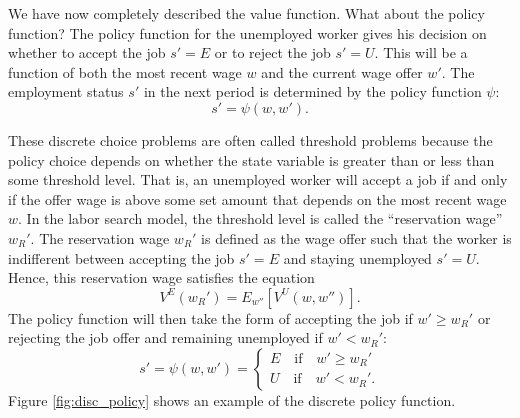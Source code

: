We have now completely described the value function. What about the policy function?
The policy function for the unemployed worker gives his decision on whether to accept the job $s'=E$
or to reject the job $s'= U$.
This will be a function of both the most recent wage $w$ and the current wage offer $w'$.
The employment status $s'$ in the next period is determined by the policy function $\psi$:
\[
s' = \psi(w,w').
\]

These discrete choice problems are often called threshold
problems because the policy choice depends on whether the state variable is greater than or less than
some threshold level. That is, an unemployed worker will accept a job if and only if the offer wage is
above some set amount that depends on the most recent wage $w$. In the labor search model,
the threshold level is called the ``reservation wage'' $w_R'$. The reservation wage $w_R'$ is defined as
the wage offer such that the worker is indifferent between accepting the job $s' = E$ and
staying unemployed $s' = U$. Hence, this reservation wage satisfies the equation
\begin{equation}\label{EqWR}
   V^E(w_R') = E_{w''}\left[V^U(w,w'')\right].
\end{equation}
The policy function will then take the form of accepting the job if $w' \geq w_R'$ or
rejecting the job offer and remaining unemployed if $w' < w_R'$:
\begin{equation}\label{EqSprime}
   s' = \psi(w,w') = \begin{cases}
                      E \quad\text{if}\quad w' \geq w_R' \\
                      U \quad\text{if}\quad w' < w_R'.
                   \end{cases}
\end{equation}
Figure \ref{fig:disc_policy} shows an example of the discrete policy function.

